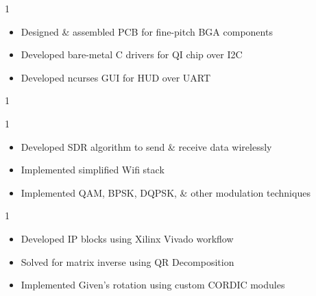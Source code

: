 \documentclass[10pt, letterpaper, ragged2e, withhyper]{AltaCV/altacv}
\def\RUWPTRX{1}		%
\def\RUSDR{0}		%
\def\RUXILINX{0}	%
\begin{document}


\makecvheader


\begin{paracol}{2}


\if\RUWPTRX1
\begin{itemize}
\item Designed \& assembled PCB for fine-pitch BGA components
\item Developed bare-metal C drivers for QI chip over I2C
\item Developed ncurses GUI for HUD over UART 
\end{itemize}
\fi

\if\RUSDR1

\if\RUWPTRX1
\divider
\fi

\begin{itemize}
\item Developed SDR algorithm to send \& receive data wirelessly
\item Implemented simplified Wifi stack
\item Implemented QAM, BPSK, DQPSK, \& other modulation techniques
\end{itemize}
\fi


\if\RUXILINX1

\divider

\begin{itemize}
\item Developed IP blocks using Xilinx Vivado workflow
\item Solved for matrix inverse using QR Decomposition
\item Implemented Given's rotation using custom CORDIC modules
\end{itemize}
\fi


\end{paracol}
\end{document}
